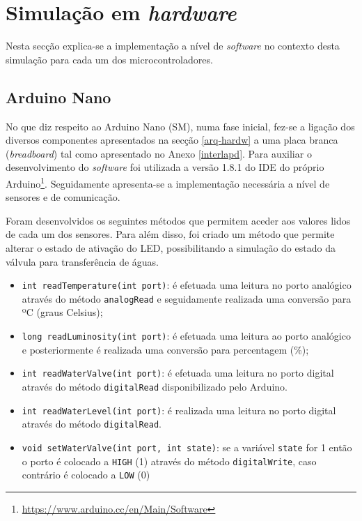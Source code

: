 







\section{Simulação em \textit{hardware}}

Nesta secção explica-se a implementação a nível de \textit{software} no contexto desta simulação para cada um dos microcontroladores. 


\subsection{Arduino Nano}
\label{arduinonanoard}

No que diz respeito ao Arduino Nano (\acl{SM}), numa fase inicial,  fez-se a ligação dos diversos componentes  apresentados na secção \ref{arq-hardw} a uma placa branca (\textit{breadboard}) tal como apresentado no Anexo \ref{interlapd}. Para auxiliar o desenvolvimento do \textit{software} foi utilizada a versão 1.8.1 do \ac{IDE} do próprio Arduino\footnote{\url{https://www.arduino.cc/en/Main/Software}}. Seguidamente apresenta-se a implementação necessária a nível de sensores e de comunicação. 


Foram desenvolvidos os seguintes métodos que permitem aceder aos valores lidos de cada um dos sensores. Para além disso, foi criado um método que permite alterar o estado de ativação do \ac{LED}, possibilitando a simulação do estado da válvula para transferência de águas. 

\begin{itemize}
	\item \texttt{int readTemperature(int port)}: é efetuada uma leitura no porto analógico através do método \texttt{analogRead} e seguidamente realizada uma conversão para ºC (graus Celsius);
	
	\item \texttt{long readLuminosity(int port)}: é efetuada uma leitura ao porto analógico e posteriormente é realizada uma conversão para percentagem (\%); 
	
	\item \texttt{int readWaterValve(int port)}: é efetuada uma leitura no porto digital através do método \texttt{digitalRead} disponibilizado pelo Arduino.
	
	\item \texttt{int readWaterLevel(int port)}: é realizada uma leitura no porto digital através do método \texttt{digitalRead}.
	
	
	\item \texttt{void setWaterValve(int port, int state)}: se a variável \texttt{state} for 1 então o porto é colocado a \texttt{HIGH} (1) através do método \texttt{digitalWrite}, caso contrário é colocado a \texttt{LOW} (0)
	
\end{itemize}

